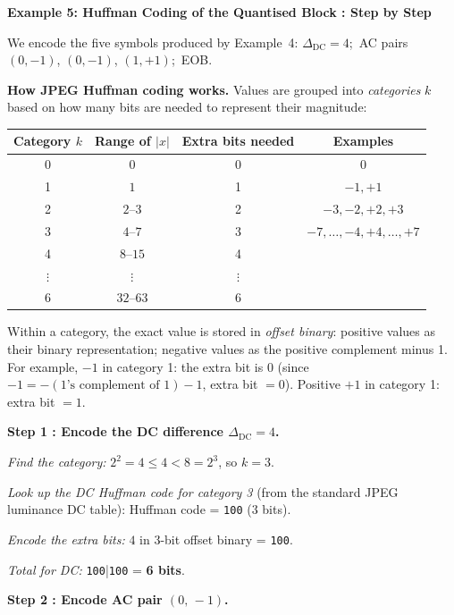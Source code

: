 \begin{examplebox}
\textbf{Example 5: Huffman Coding of the Quantised Block : Step by Step}

\medskip
\noindent We encode the five symbols produced by Example~4:
$\Delta_{\text{DC}}=4$;\ AC pairs $(0,-1)$, $(0,-1)$, $(1,+1)$;\ EOB.

\medskip
\noindent\textbf{How JPEG Huffman coding works.}
Values are grouped into \emph{categories} $k$ based on how many bits are
needed to represent their magnitude:

\begin{center}
\setlength{\tabcolsep}{8pt}
\begin{tabular}{cccc}
\toprule
Category $k$ & Range of $|x|$ & Extra bits needed & Examples \\
\midrule
0 & $0$                     & 0 & 0 \\
1 & $1$                     & 1 & $-1,+1$ \\
2 & $2\text{--}3$           & 2 & $-3,-2,+2,+3$ \\
3 & $4\text{--}7$           & 3 & $-7,\ldots,-4,+4,\ldots,+7$ \\
4 & $8\text{--}15$          & 4 & \\
$\vdots$ & $\vdots$         & $\vdots$ & \\
6 & $32\text{--}63$         & 6 & \\
\bottomrule
\end{tabular}
\end{center}

Within a category, the exact value is stored in \emph{offset binary}:
positive values as their binary representation; negative values as the
positive complement minus 1.  For example, $-1$ in category 1: the extra
bit is $0$ (since $-1 = -(1\text{'s complement of }1) - 1$, extra bit $=0$).
Positive $+1$ in category 1: extra bit $=1$.

\medskip
\noindent\textbf{Step 1 : Encode the DC difference $\Delta_{\text{DC}}=4$.}

\textit{Find the category:}
$2^2=4\le 4 < 8=2^3$, so $k=3$.

\textit{Look up the DC Huffman code for category 3} (from the standard JPEG
luminance DC table):
Huffman code = \texttt{100} (3 bits).

\textit{Encode the extra bits:}
$4$ in 3-bit offset binary = \texttt{100}.

\textit{Total for DC:} \texttt{100}\;|\;\texttt{100} = \textbf{6 bits}.

\medskip
\noindent\textbf{Step 2 : Encode AC pair $(0,\,-1)$.}


\end{examplebox}
